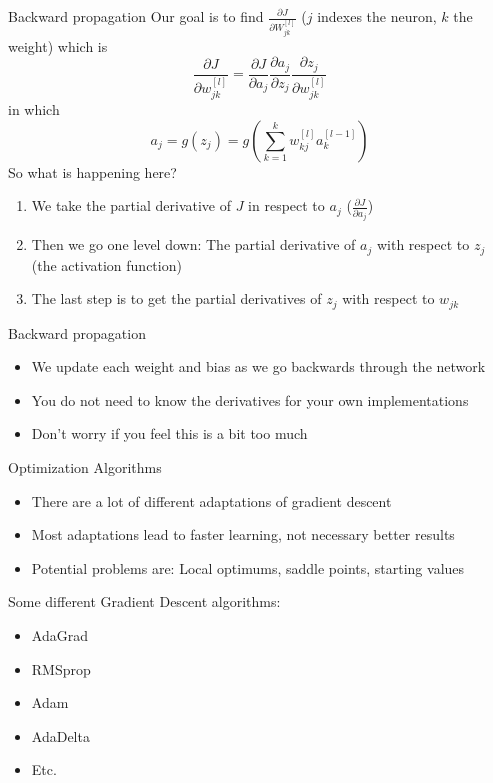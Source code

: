 \documentclass{beamer}
\begin{document}
\begin{frame}[t]{Backward propagation}
  Our goal is to find $\frac{\partial J}{\partial W^{[l]}_{jk}}$ ($j$ indexes the neuron, $k$ the weight) which is
  \begin{equation}
    \frac{\partial J}{\partial w^{[l]}_{jk}} = \frac{\partial J}{\partial a_j}\frac{\partial a_j}{\partial z_j}\frac{\partial z_j}{\partial w^{[l]}_{jk}}
  \end{equation}
  in which 
  \begin{equation}
    a_j = g(z_j) =  g(\sum^k_{k=1} w^{[l]}_{kj}a^{[l-1]}_{k})
  \end{equation}
  So what is happening here?
  \begin{enumerate}
    \item We take the partial derivative of $J$ in respect to $a_j$ ($\frac{\partial J}{\partial a_j}$)
    \item Then we go one level down: The partial derivative of $a_j$ with respect to $z_j$ (the activation function)
    \item The last step is to get the partial derivatives of $z_j$ with respect to $w_{jk}$ 
  \end{enumerate}
\end{frame}

\begin{frame}[t]{Backward propagation}
  \begin{itemize}
    \item We update each weight and bias as we go backwards through the network
    \item You do not need to know the derivatives for your own implementations
    \item Don't worry if you feel this is a bit too much
  \end{itemize}
\end{frame}

\begin{frame}[t]{Optimization Algorithms}
  \begin{itemize}
    \item There are a lot of different adaptations of gradient descent
    \item Most adaptations lead to faster learning, not necessary better results
    \item Potential problems are: Local optimums, saddle points, starting values
  \end{itemize}
  Some different Gradient Descent algorithms:
  \begin{itemize}
    \item AdaGrad
    \item RMSprop
    \item Adam
    \item AdaDelta
    \item Etc.
  \end{itemize}
\end{frame}
\end{document}

